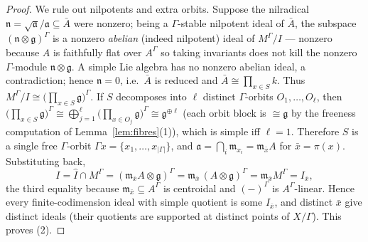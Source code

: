 \documentclass{amsart}
\theoremstyle{definition}
\newcommand{\g}{\mathfrak{g}}
\newcommand{\M}{M}
\begin{document}
\begin{proof}
We rule out nilpotents and extra orbits.  Suppose the nilradical
$\mathfrak n=\sqrt{\mathfrak a}/\mathfrak a\subseteq\bar A$ were nonzero; being a
$\Gamma$-stable nilpotent ideal of $\bar A$, the subspace
$(\mathfrak n\otimes\g)^\Gamma$ is a nonzero \emph{abelian} (indeed nilpotent)
ideal of $\M^\Gamma/I$ — nonzero because $A$ is faithfully flat over $A^\Gamma$
so taking invariants does not kill the nonzero $\Gamma$-module
$\mathfrak n\otimes\g$.  A simple Lie algebra has no nonzero abelian ideal, a
contradiction; hence $\mathfrak n=0$, i.e.\ $\bar A$ is reduced and
$\bar A\cong\prod_{x\in S}k$.  Thus
$\M^\Gamma/I\cong\bigl(\prod_{x\in S}\g\bigr)^\Gamma$.  If $S$ decomposes
into $\ell$ distinct $\Gamma$-orbits $O_1,\dots,O_\ell$, then
$\bigl(\prod_{x\in S}\g\bigr)^\Gamma\cong\bigoplus_{j=1}^\ell
\bigl(\prod_{x\in O_j}\g\bigr)^\Gamma\cong\g^{\oplus\ell}$
(each orbit block is $\cong\g$ by the freeness computation of
Lemma~\ref{lem:fibres}(1)), which is simple iff $\ell=1$.  Therefore $S$ is a
single free $\Gamma$-orbit $\Gamma x=\{x_1,\dots,x_{|\Gamma|}\}$, and
$\mathfrak a=\bigcap_i\mathfrak m_{x_i}=\mathfrak m_{\bar x}A$ for
$\bar x=\pi(x)$.  Substituting back,
\[
I=\widehat I\cap\M^\Gamma=(\mathfrak m_{\bar x}A\otimes\g)^\Gamma
=\mathfrak m_{\bar x}\,(A\otimes\g)^\Gamma=\mathfrak m_{\bar x}\M^\Gamma=
I_{\bar x},
\]
the third equality because $\mathfrak m_{\bar x}\subseteq A^\Gamma$ is
centroidal and $(-)^\Gamma$ is $A^\Gamma$-linear.
Hence every finite-codimension ideal with simple quotient is some
$I_{\bar x}$, and distinct $\bar x$ give distinct ideals (their quotients
are supported at distinct points of $X/\Gamma$).  This proves (2).
\end{proof}
\end{document}
